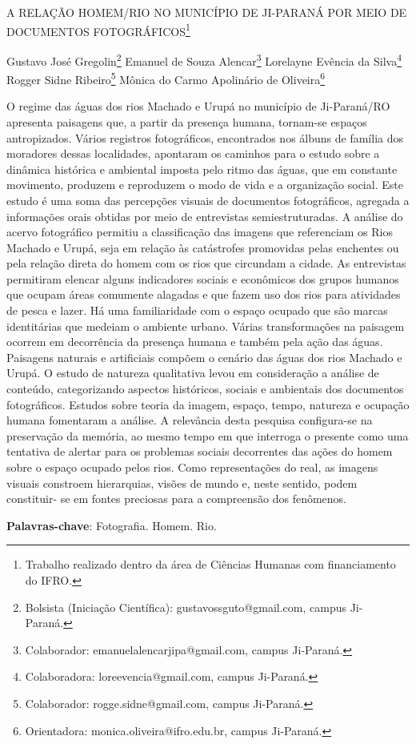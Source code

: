 \documentclass[article,12pt,onesidea,4paper,english,brazil]{abntex2}
\begin{document}
	
	
	\frenchspacing 
	
	\begin{center}
		\LARGE A RELAÇÃO HOMEM/RIO NO MUNICÍPIO DE JI-PARANÁ POR MEIO DE
		DOCUMENTOS FOTOGRÁFICOS\footnote{Trabalho realizado dentro da área de Ciências Humanas com financiamento do IFRO.}
		
		\normalsize
		Gustavo José Gregolin\footnote{Bolsista (Iniciação Científica): gustavossguto@gmail.com, campus Ji-Paraná.} 
		Emanuel de Souza Alencar\footnote{Colaborador: emanuelalencarjipa@gmail.com, campus Ji-Paraná.} 
		Lorelayne Evência da Silva\footnote{Colaboradora: loreevencia@gmail.com, campus Ji-Paraná.} 
		Rogger Sidne Ribeiro\footnote{Colaborador: rogge.sidne@gmail.com, campus Ji-Paraná.}
		Mônica do Carmo Apolinário de Oliveira\footnote{Orientadora: monica.oliveira@ifro.edu.br, campus Ji-Paraná.} 
	\end{center}
	
	\noindent O regime das águas dos rios Machado e Urupá no município de Ji-Paraná/RO
	apresenta paisagens que, a partir da presença humana, tornam-se espaços
	antropizados. Vários registros fotográficos, encontrados nos álbuns de família dos
	moradores dessas localidades, apontaram os caminhos para o estudo sobre a
	dinâmica histórica e ambiental imposta pelo ritmo das águas, que em constante
	movimento, produzem e reproduzem o modo de vida e a organização social. Este
	estudo é uma soma das percepções visuais de documentos fotográficos, agregada a
	informações orais obtidas por meio de entrevistas semiestruturadas. A análise do
	acervo fotográfico permitiu a classificação das imagens que referenciam os Rios
	Machado e Urupá, seja em relação às catástrofes promovidas pelas enchentes ou
	pela relação direta do homem com os rios que circundam a cidade. As entrevistas
	permitiram elencar alguns indicadores sociais e econômicos dos grupos humanos
	que ocupam áreas comumente alagadas e que fazem uso dos rios para atividades
	de pesca e lazer. Há uma familiaridade com o espaço ocupado que são marcas
	identitárias que medeiam o ambiente urbano. Várias transformações na paisagem
	ocorrem em decorrência da presença humana e também pela ação das águas.
	Paisagens naturais e artificiais compõem o cenário das águas dos rios Machado e
	Urupá. O estudo de natureza qualitativa levou em consideração a análise de
	conteúdo, categorizando aspectos históricos, sociais e ambientais dos documentos
	fotográficos. Estudos sobre teoria da imagem, espaço, tempo, natureza e ocupação
	humana fomentaram a análise. A relevância desta pesquisa configura-se na
	preservação da memória, ao mesmo tempo em que interroga o presente como uma
	tentativa de alertar para os problemas sociais decorrentes das ações do homem
	sobre o espaço ocupado pelos rios. Como representações do real, as imagens	
	visuais constroem hierarquias, visões de mundo e, neste sentido, podem constituir-
	se em fontes preciosas para a compreensão dos fenômenos.
	
	\vspace{\onelineskip}
	
	\noindent
	\textbf{Palavras-chave}: Fotografia. Homem. Rio.
	
\end{document}
